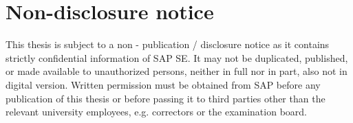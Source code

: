 \section*{Non-disclosure notice}
\label{sec:non-disclosure_notice}

This thesis is subject to a non - publication / disclosure notice as it contains
strictly confidential information of SAP SE. It may not be duplicated, published, or
made available to unauthorized persons, neither in full nor in part, also not in
digital version. Written permission must be obtained from SAP before any
publication of this thesis or before passing it to third parties other than the
relevant university employees, e.g. correctors or the examination board.

\begin{verbatim}

\end{verbatim}
   